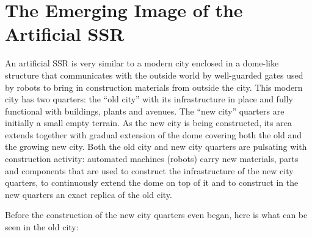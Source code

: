 \section{The Emerging Image of the Artificial SSR}

An artificial SSR is very similar to a modern city enclosed in a
dome-like structure that communicates with the outside world by
well-guarded gates used by robots to bring in construction materials
from outside the city. This modern city has two quarters: the “old
city” with its infrastructure in place and fully functional with
buildings, plants and avenues. The “new city” quarters are initially a
small empty terrain. As the new city is being constructed, its area
extends together with gradual extension of the dome covering both the
old and the growing new city. Both the old city and new city quarters
are pulsating with construction activity: automated machines (robots)
carry new materials, parts and components that are used to construct
the infrastructure of the new city quarters, to continuously extend the
dome on top of it and to construct in the new quarters an exact replica
of the old city.

Before the construction of the new city quarters even began, here is
what can be seen in the old city:

